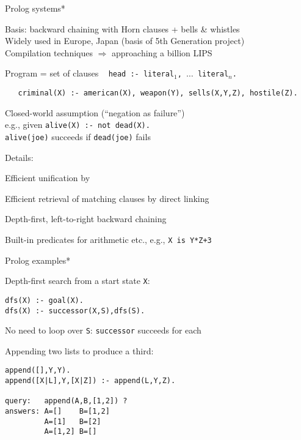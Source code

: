 \begin{frame}[fragile]
\begin{slidecore}{Prolog systems*}

\item Basis: backward chaining with Horn clauses + bells \& whistles\\
Widely used in Europe, Japan (basis of 5th Generation project)\\
Compilation techniques $\Rightarrow$ approaching a billion LIPS

\item Program = set of clauses ~ {\tt head :- literal$_1$, $\ldots$ literal$_n$.}
{\small\begin{verbatim}
   criminal(X) :- american(X), weapon(Y), sells(X,Y,Z), hostile(Z).
\end{verbatim}}

\item Closed-world assumption (``negation as failure'')\\ \quad
   e.g., given {\tt alive(X) :- not dead(X).}\\ \quad
   {\tt alive(joe)} succeeds if {\tt dead(joe)} fails

\item Details:
\begin{items}
\item Efficient unification by 
\item Efficient retrieval of matching clauses by direct linking
\item Depth-first, left-to-right backward chaining
\item Built-in predicates for arithmetic etc., e.g., {\tt X is Y*Z+3}
\end{items}

\end{slidecore}
\end{frame}


\begin{frame}[fragile]
\begin{slidecore}{Prolog examples*}

\item Depth-first search from a start state {\tt X}:
\begin{verbatim}
dfs(X) :- goal(X).
dfs(X) :- successor(X,S),dfs(S).
\end{verbatim}
No need to loop over {\tt S}: {\tt successor} succeeds for each

\item Appending two lists to produce a third:
\begin{verbatim}
append([],Y,Y).                         
append([X|L],Y,[X|Z]) :- append(L,Y,Z). 
                                        
query:   append(A,B,[1,2]) ?            
answers: A=[]    B=[1,2]
         A=[1]   B=[2]
         A=[1,2] B=[]
\end{verbatim}

\end{slidecore}
\end{frame}

